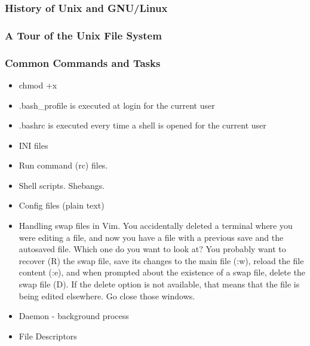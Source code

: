 
\subsubsection{History of Unix and GNU/Linux}


\subsubsection{A Tour of the Unix File System}



\subsubsection{Common Commands and Tasks}


\begin{itemize}
	\item chmod +x
	\item .bash\_profile is executed at login for the current user
	\item .bashrc is executed every time a shell is opened for the current user
	\item INI files
	\item Run command (rc) files.
	\item Shell scripts. Shebangs.
	\item Config files (plain text)
	\item Handling swap files in Vim. You accidentally deleted a terminal where you were editing a file, and now you have a file with a previous save and the autosaved file. Which one do you want to look at? You probably want to recover (R) the swap file, save its changes to the main file (:w), reload the file content (:e), and when prompted about the existence of a swap file, delete the swap file (D). If the delete option is not available, that means that the file is being edited elsewhere. Go close those windows.
	\item Daemon - background process
	\item File Descriptors
\end{itemize}

